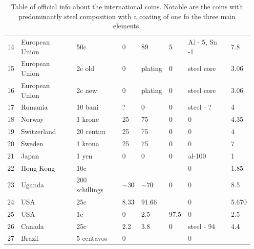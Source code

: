 \documentclass[11pt,a4paper,twoside,onecolumn]{article}
\begin{document}
\begin{table}[htbp]
\begin{tabular}{@{}llllllll@{}}
        14 & European Union & 50c            & 0        & 89       & 5      & Al - 5, Sn -1   & 7.8        \\
        15 & European Union & 2c old         & 0        & plating  & 0      & steel core      & 3.06       \\
        16 & European Union & 2c new         & 0        & plating  & 0      & steel core      & 3.06       \\
        17 & Romania        & 10 bani        & ?        & 0        & 0      & steel - ?       & 4          \\
        18 & Norway         & 1 krone        & 25       & 75       & 0      & 0               & 4.35       \\
        19 & Switzerland    & 20 centim      & 25       & 75       & 0      & 0               & 4          \\
        20 & Sweden         & 1 krona        & 25       & 75       & 0      & 0               & 7          \\
        21 & Japan          & 1 yen          & 0        & 0        & 0      & al-100          & 1          \\
        22 & Hong Kong      & 10c            &          &          &        & 0               & 1.85       \\
        23 & Uganda         & 200 schillings & $\sim$30 & $\sim$70 & 0      & 0               & 8.5        \\
        24 & USA            & 25c            & 8.33     & 91.66    &        & 0               & 5.670       \\
        25 & USA            & 1c             & 0        & 2.5      & 97.5   & 0               & 2.5        \\
        26 & Canada         & 25c            & 2.2      & 3.8      & 0      & steel - 94      & 4.4        \\
        27 & Brazil         & 5 centavos     & 0        &          &        & 0               &            \\ \bottomrule
    \end{tabular}
    \caption{Table of official info about the international coins. Notable are the coins with predominantly steel composition with a coating of one fo the three main elements.}
    \label{tab:coins-official}
\end{table}
\end{document}

